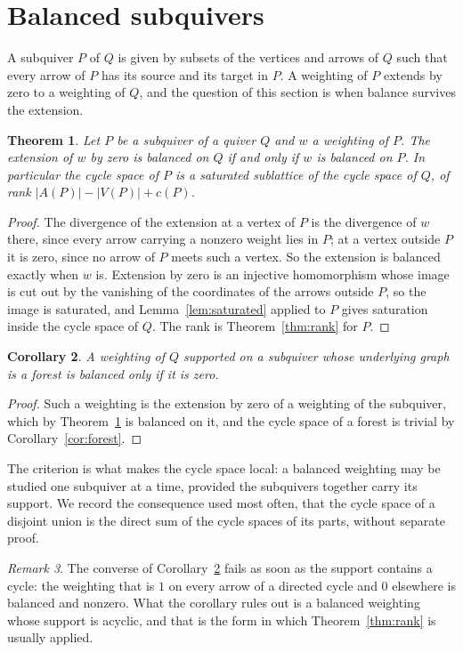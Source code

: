 \documentclass[11pt]{article}
\theoremstyle{plain}
\newtheorem{theorem}{Theorem}[section]
\newtheorem{corollary}[theorem]{Corollary}
\theoremstyle{definition}
\theoremstyle{remark}
\newtheorem{remark}[theorem]{Remark}
\begin{document}
\section{Balanced subquivers}

A subquiver $P$ of $Q$ is given by subsets of the vertices and arrows of $Q$ such that every arrow of $P$ has its source and its target in $P$. A weighting of $P$ extends by zero to a weighting of $Q$, and the question of this section is when balance survives the extension.

\begin{theorem}\label{thm:subquiver}
Let $P$ be a subquiver of a quiver $Q$ and $w$ a weighting of $P$. The extension of $w$ by zero is balanced on $Q$ if and only if $w$ is balanced on $P$. In particular the cycle space of $P$ is a saturated sublattice of the cycle space of $Q$, of rank $|A(P)| - |V(P)| + c(P)$.
\end{theorem}

\begin{proof}
The divergence of the extension at a vertex of $P$ is the divergence of $w$ there, since every arrow carrying a nonzero weight lies in $P$; at a vertex outside $P$ it is zero, since no arrow of $P$ meets such a vertex. So the extension is balanced exactly when $w$ is. Extension by zero is an injective homomorphism whose image is cut out by the vanishing of the coordinates of the arrows outside $P$, so the image is saturated, and Lemma~\ref{lem:saturated} applied to $P$ gives saturation inside the cycle space of $Q$. The rank is Theorem~\ref{thm:rank} for $P$.
\end{proof}

\begin{corollary}\label{cor:subquiver}
A weighting of $Q$ supported on a subquiver whose underlying graph is a forest is balanced only if it is zero.
\end{corollary}

\begin{proof}
Such a weighting is the extension by zero of a weighting of the subquiver, which by Theorem~\ref{thm:subquiver} is balanced on it, and the cycle space of a forest is trivial by Corollary~\ref{cor:forest}.
\end{proof}

The criterion is what makes the cycle space local: a balanced weighting may be studied one subquiver at a time, provided the subquivers together carry its support. We record the consequence used most often, that the cycle space of a disjoint union is the direct sum of the cycle spaces of its parts, without separate proof.

\begin{remark}\label{rem:local}
The converse of Corollary~\ref{cor:subquiver} fails as soon as the support contains a cycle: the weighting that is $1$ on every arrow of a directed cycle and $0$ elsewhere is balanced and nonzero. What the corollary rules out is a balanced weighting whose support is acyclic, and that is the form in which Theorem~\ref{thm:rank} is usually applied.
\end{remark}
\end{document}
